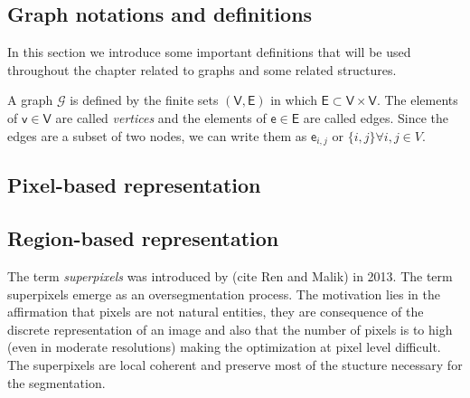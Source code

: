 \subsection{Graph notations and definitions}

In this section we introduce some important definitions that will be used throughout the chapter related to graphs and some related structures.

\begin{definition}[Graph]
	A graph $\mathcal{G}$ is defined by the finite sets $(\mathsf{V}, \mathsf{E})$ in which $\mathsf{E} \subset \mathsf{V} \times \mathsf{V}$. The elements of $\mathsf{v} \in \mathsf{V}$ are called \textit{vertices} and the elements of $\mathsf{e} \in \mathsf{E}$ are called edges. Since the edges are a subset of two nodes, we can write them as $\mathsf{e}_{i,j}$ or $\{i,j\} \forall i, j \in V$.
\end{definition}

\begin{definition}[Neighborhood]

\end{definition}

\begin{definition}[Subgraph]

\end{definition}

\begin{definition}

\end{definition}

\begin{definition}[Adjacency]

\end{definition}

\begin{definition}

\end{definition}

\begin{definition}

\end{definition}

\subsection{Pixel-based representation}


\subsection{Region-based representation}
The term \textit{superpixels} was introduced by (cite Ren and Malik) in 2013. The term superpixels emerge as an oversegmentation process. The motivation lies in the affirmation that pixels are not natural entities, they are consequence of the discrete representation of an image and also that the number of pixels is to high (even in moderate resolutions) making the optimization at pixel level difficult. The superpixels are local coherent and preserve most of the stucture necessary for the segmentation.  

